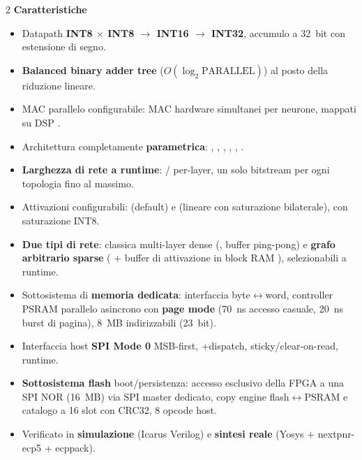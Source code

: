 \vspace{8pt}
\begin{multicols}{2}
{\color{fnDark}\large\bfseries Caratteristiche}\\[2pt]
{\footnotesize
\begin{itemize}[leftmargin=1.1em]
\item Datapath \textbf{INT8 $\times$ INT8 $\to$ INT16 $\to$ INT32}, accumulo a 32~bit
      con estensione di segno.
\item \textbf{Balanced binary adder tree} ($O(\log_2 \text{PARALLEL})$) al posto della
      riduzione lineare.
\item MAC parallelo configurabile:  MAC hardware simultanei per neurone,
      mappati su DSP .
\item Architettura completamente \textbf{parametrica}: , ,
      , , , .
\item \textbf{Larghezza di rete a runtime}: /
      per-layer, un solo bitstream per ogni topologia fino al massimo.
\item Attivazioni configurabili:  (default) e  (lineare
      con saturazione bilaterale), con saturazione INT8.
\item \textbf{Due tipi di rete}: classica multi-layer dense (,
      buffer ping-pong) e \textbf{grafo arbitrario sparse} ( +
      buffer di attivazione in block RAM ), selezionabili a runtime.
\item Sottosistema di \textbf{memoria dedicata}: interfaccia byte$\leftrightarrow$word,
      controller PSRAM parallelo asincrono con \textbf{page mode} (70~ns accesso
      casuale, 20~ns burst di pagina), 8~MB indirizzabili (23~bit).
\item Interfaccia host \textbf{SPI Mode 0} MSB-first, +dispatch, 
      sticky/clear-on-read,  runtime.
\item \textbf{Sottosistema flash} boot/persistenza: accesso esclusivo della FPGA a una
       SPI NOR (16~MB) via SPI master dedicato, copy engine
      flash$\leftrightarrow$PSRAM e catalogo a 16 slot con CRC32, 8 opcode host.
\item Verificato in \textbf{simulazione} (Icarus Verilog) e \textbf{sintesi reale}
      (Yosys + nextpnr-ecp5 + ecppack).
\end{itemize}}


\end{multicols}
